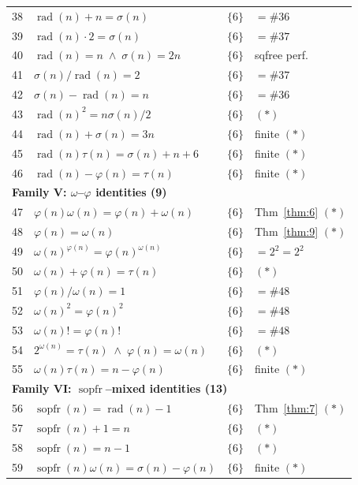 \documentclass{article}
\newcommand{\rad}{\operatorname{rad}}
\newcommand{\sopfr}{\operatorname{sopfr}}
\begin{document}
\begin{longtable}{rp{7.5cm}ll}
38 & $\rad(n) + n = \sigma(n)$ & $\{6\}$ & $= \#36$ \\
39 & $\rad(n) \cdot 2 = \sigma(n)$ & $\{6\}$ & $= \#37$ \\
40 & $\rad(n) = n \;\wedge\; \sigma(n) = 2n$ & $\{6\}$ & sqfree perf.\ \\
41 & $\sigma(n)/\rad(n) = 2$ & $\{6\}$ & $= \#37$ \\
42 & $\sigma(n) - \rad(n) = n$ & $\{6\}$ & $= \#36$ \\
43 & $\rad(n)^2 = n\sigma(n)/2$ & $\{6\}$ & $(*)$ \\
44 & $\rad(n) + \sigma(n) = 3n$ & $\{6\}$ & finite $(*)$ \\
45 & $\rad(n)\tau(n) = \sigma(n) + n + 6$ & $\{6\}$ & finite $(*)$ \\
46 & $\rad(n) - \varphi(n) = \tau(n)$ & $\{6\}$ & finite $(*)$ \\[4pt]
\multicolumn{4}{l}{\textbf{Family V: $\omega$--$\varphi$ identities (9)}} \\
47 & $\varphi(n)\omega(n) = \varphi(n) + \omega(n)$ & $\{6\}$ & Thm~\ref{thm:6} $(*)$ \\
48 & $\varphi(n) = \omega(n)$  & $\{6\}$ & Thm~\ref{thm:9} $(*)$ \\
49 & $\omega(n)^{\varphi(n)} = \varphi(n)^{\omega(n)}$ & $\{6\}$ & $= 2^2 = 2^2$ \\
50 & $\omega(n) + \varphi(n) = \tau(n)$  & $\{6\}$ & $(*)$ \\
51 & $\varphi(n)/\omega(n) = 1$  & $\{6\}$ & $= \#48$ \\
52 & $\omega(n)^2 = \varphi(n)^2$  & $\{6\}$ & $= \#48$ \\
53 & $\omega(n)! = \varphi(n)!$  & $\{6\}$ & $= \#48$ \\
54 & $2^{\omega(n)} = \tau(n) \;\wedge\; \varphi(n) = \omega(n)$ & $\{6\}$ & $(*)$ \\
55 & $\omega(n)\tau(n) = n - \varphi(n)$ & $\{6\}$ & finite $(*)$ \\[4pt]
\multicolumn{4}{l}{\textbf{Family VI: $\sopfr$--mixed identities (13)}} \\
56 & $\sopfr(n) = \rad(n) - 1$ & $\{6\}$ & Thm~\ref{thm:7} $(*)$ \\
57 & $\sopfr(n) + 1 = n$ & $\{6\}$ & $(*)$ \\
58 & $\sopfr(n) = n - 1$  & $\{6\}$ & $(*)$ \\
59 & $\sopfr(n)\omega(n) = \sigma(n) - \varphi(n)$ & $\{6\}$ & finite $(*)$ \\

\end{longtable}
\end{document}
